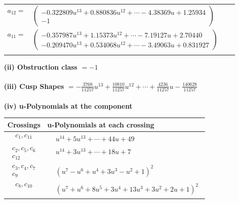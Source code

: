 \documentclass[1p]{elsarticle_modified}
\theoremstyle{definition}
\begin{document}
\begin{tabular}{m{7pt} m{180pt} m{7pt} m{180pt} }
\flushright $a_{12}=$&$\begin{pmatrix}-0.322809 u^{13}+0.880836 u^{12}+\cdots-4.38369 u+1.25934\\-1\end{pmatrix}$ \\
\flushright $a_{11}=$&$\begin{pmatrix}-0.357987 u^{13}+1.15373 u^{12}+\cdots-7.19127 u+2.70440\\-0.209470 u^{13}+0.534068 u^{12}+\cdots-3.49063 u+0.831927\end{pmatrix}$\\&\end{tabular}
\flushleft \textbf{(ii) Obstruction class $= -1$}\\~\\
\flushleft \textbf{(iii) Cusp Shapes $= -\frac{3768}{11257} u^{13}+\frac{10810}{11257} u^{12}+\cdots+\frac{4236}{11257} u-\frac{140628}{11257}$}\\~\\
\newpage\renewcommand{\arraystretch}{1}
\flushleft \textbf{(iv) u-Polynomials at the component}\newline \\
\begin{tabular}{m{50pt}|m{274pt}}
Crossings & \hspace{64pt}u-Polynomials at each crossing \\
\hline $$\begin{aligned}c_{1},c_{11}\end{aligned}$$&$\begin{aligned}
&u^{14}+5 u^{13}+\cdots+44 u+49
\end{aligned}$\\
\hline $$\begin{aligned}c_{2},c_{5},c_{6}\\c_{12}\end{aligned}$$&$\begin{aligned}
&u^{14}+3 u^{13}+\cdots+18 u+7
\end{aligned}$\\
\hline $$\begin{aligned}c_{3},c_{4},c_{7}\\c_{9}\end{aligned}$$&$\begin{aligned}
&(u^7- u^6+u^4+3 u^3- u^2+1)^2
\end{aligned}$\\
\hline $$\begin{aligned}c_{8},c_{10}\end{aligned}$$&$\begin{aligned}
&(u^7+u^6+8 u^5+3 u^4+13 u^3+3 u^2+2 u+1)^2
\end{aligned}$\\
\hline
\end{tabular}\\~\\
\end{document}
